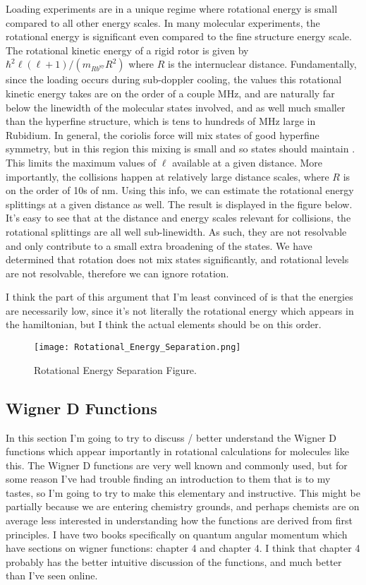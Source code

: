 \documentclass[prl, longbibliography]{revtex4-2}
\begin{document}
Loading experiments are in a unique regime where rotational energy is small compared to all other energy scales. In many molecular experiments, the rotational energy is significant even compared to the fine structure energy scale. The rotational kinetic energy of a rigid rotor is given by $\hbar^2 \ell (\ell+1)/(m_{Rb^{87}}R^2)$ where $R$ is the internuclear distance. Fundamentally, since the loading occurs during sub-doppler cooling, the values this rotational kinetic energy takes are on the order of a couple MHz, and are naturally far below the linewidth of the molecular states involved, and as well much smaller than the hyperfine structure, which is tens to hundreds of MHz large in Rubidium. In general, the coriolis force will mix states of good hyperfine symmetry, but in this region this mixing is small and so states should maintain . This limits the maximum values of $\ell$ available at a given distance. More importantly, the collisions happen at relatively large distance scales, where $R$ is on the order of 10s of nm. Using this info, we can estimate the rotational energy splittings at a given distance as well. The result is displayed in the figure below. It's easy to see that at the distance and energy scales relevant for collisions, the rotational splittings are all well sub-linewidth. As such, they are not resolvable and only contribute to a small extra broadening of the states. We have determined that rotation does not mix states significantly, and rotational levels are not resolvable, therefore we can ignore rotation.\cite{hornkohl_parity_2017}

I think the part of this argument that I'm least convinced of is that the energies are necessarily low, since it's not literally the rotational energy which appears in the hamiltonian, but I think the actual elements should be on this order. 

\begin{figure}
  \texttt{[image: Rotational\_Energy\_Separation.png]}
  \caption{Rotational Energy Separation Figure.}
  \label{fig:boat1}
\end{figure}

\subsection{Wigner D Functions}

In this section I'm going to try to discuss / better understand the Wigner D functions which appear importantly in rotational calculations for molecules like this. The Wigner D functions are very well known and commonly used, but for some reason I've had trouble finding an introduction to them that is to my tastes, so I'm going to try to make this elementary and instructive. This might be partially because we are entering chemistry grounds, and perhaps chemists are on average less interested in understanding how the functions are derived from first principles. I have two books specifically on quantum angular momentum which have sections on wigner functions: \cite{edmonds_angular_1960} chapter 4 and \cite{varshalovich_quantum_1988} chapter 4. I think that \cite{edmonds_angular_1960} chapter 4 probably has the better intuitive discussion of the functions, and much better than I've seen online.
\end{document}
